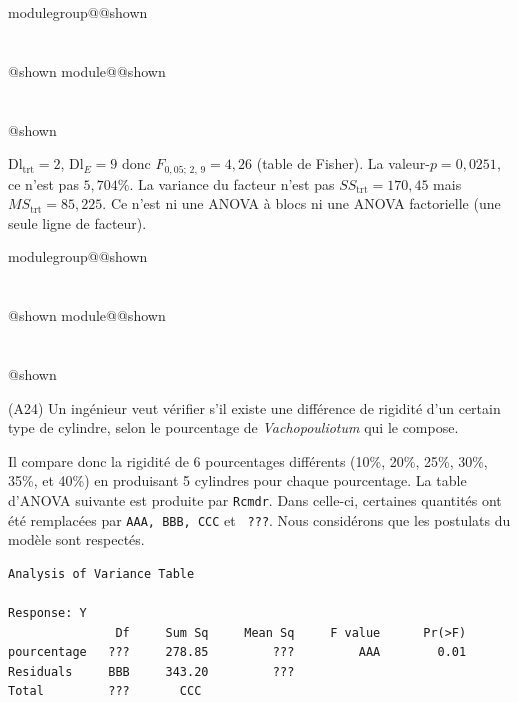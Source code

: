 \documentclass{Evaluation}
\makeatletter
\newcommand{\currentmodulekey}{}
\newcommand{\currentmoduletitle}{}
\newcommand{\currentgroupkey}{}
\newcommand{\currentgrouptitle}{}
\newcommand{\showmoduleifneeded}{%
  \ifx\currentgroupkey\empty\else
    \expandafter\ifx\csname modulegroup@\currentgroupkey @shown\endcsname\relax
      \section*{\currentgrouptitle}%
      \expandafter\gdef\csname modulegroup@\currentgroupkey @shown\endcsname{1}%
    \fi
  \fi
  \expandafter\ifx\csname module@\currentmodulekey @shown\endcsname\relax
    \section*{\currentmoduletitle}%
    \expandafter\gdef\csname module@\currentmodulekey @shown\endcsname{1}%
  \fi
}
\newenvironment{A24}{\showmoduleifneeded}{}
\makeatother
\begin{document}
\begin{questions}
\begin{A24}
\begin{solution}
$\text{Dl}_{\text{trt}}=2$, $\text{Dl}_E=9$ donc $F_{0{,}05;\,2,\,9} = 4{,}26$ (table de Fisher). La valeur-$p = 0{,}0251$, ce n'est pas $5{,}704\%$. La variance du facteur n'est pas $SS_{\text{trt}} = 170{,}45$ mais $MS_{\text{trt}} = 85{,}225$. Ce n'est ni une ANOVA à blocs ni une ANOVA factorielle (une seule ligne de facteur).
\end{solution}
\end{A24}

\begin{A24}
\question (A24)
Un ingénieur veut vérifier s'il existe une différence de rigidité d'un certain type de cylindre, selon le pourcentage de \textit{Vachopouliotum} qui le compose.

Il compare donc la rigidité de 6 pourcentages différents (10\%, 20\%, 25\%, 30\%, 35\%, et 40\%) en produisant 5 cylindres pour chaque pourcentage.
La table d'ANOVA suivante est produite par \texttt{Rcmdr}. 
Dans celle-ci, certaines quantités ont été remplacées par \texttt{AAA, BBB, CCC} et \texttt{ ???}. Nous considérons que les postulats du modèle sont respectés.
\begin{verbatim}
Analysis of Variance Table

Response: Y
               Df     Sum Sq     Mean Sq     F value      Pr(>F)  
pourcentage   ???     278.85         ???         AAA        0.01 
Residuals     BBB     343.20         ???                  
Total         ???       CCC
\end{verbatim}

\end{A24}
\end{questions}
\end{document}
